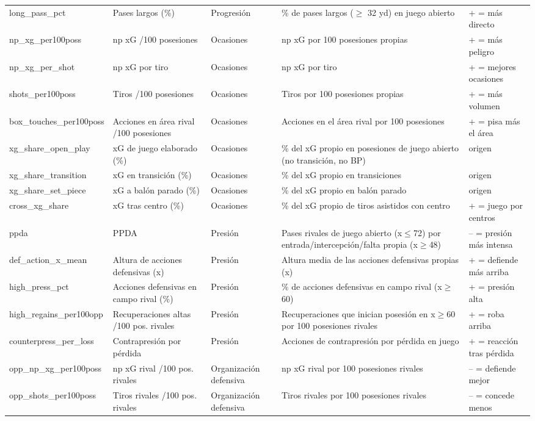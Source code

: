 {\begin{longtable}{p{3.4cm} p{3.3cm} p{2.2cm} p{5.2cm} p{2.6cm}}
long\_pass\_pct & Pases largos (\%) & Progresión & \% de pases largos ($\geq$ 32 yd) en juego abierto & + = más directo \\
np\_xg\_per100poss & np xG /100 posesiones & Ocasiones & np xG por 100 posesiones propias & + = más peligro \\
np\_xg\_per\_shot & np xG por tiro & Ocasiones & np xG por tiro & + = mejores ocasiones \\
shots\_per100poss & Tiros /100 posesiones & Ocasiones & Tiros por 100 posesiones propias & + = más volumen \\
box\_touches\_per100poss & Acciones en área rival /100 posesiones & Ocasiones & Acciones en el área rival por 100 posesiones & + = pisa más el área \\
xg\_share\_open\_play & xG de juego elaborado (\%) & Ocasiones & \% del xG propio en posesiones de juego abierto (no transición, no BP) & origen \\
xg\_share\_transition & xG en transición (\%) & Ocasiones & \% del xG propio en transiciones & origen \\
xg\_share\_set\_piece & xG a balón parado (\%) & Ocasiones & \% del xG propio en balón parado & origen \\
cross\_xg\_share & xG tras centro (\%) & Ocasiones & \% del xG propio de tiros asistidos con centro & + = juego por centros \\
ppda & PPDA & Presión & Pases rivales de juego abierto (x$\leq$72) por entrada/intercepción/falta propia (x$\geq$48) & -- = presión más intensa \\
def\_action\_x\_mean & Altura de acciones defensivas (x) & Presión & Altura media de las acciones defensivas propias (x) & + = defiende más arriba \\
high\_press\_pct & Acciones defensivas en campo rival (\%) & Presión & \% de acciones defensivas en campo rival (x$\geq$60) & + = presión alta \\
high\_regains\_per100opp & Recuperaciones altas /100 pos. rivales & Presión & Recuperaciones que inician posesión en x$\geq$60 por 100 posesiones rivales & + = roba arriba \\
counterpress\_per\_loss & Contrapresión por pérdida & Presión & Acciones de contrapresión por pérdida en juego & + = reacción tras pérdida \\
opp\_np\_xg\_per100poss & np xG rival /100 pos. rivales & Organización defensiva & np xG rival por 100 posesiones rivales & -- = defiende mejor \\
opp\_shots\_per100poss & Tiros rivales /100 pos. rivales & Organización defensiva & Tiros rivales por 100 posesiones rivales & -- = concede menos \\

\end{longtable}}
